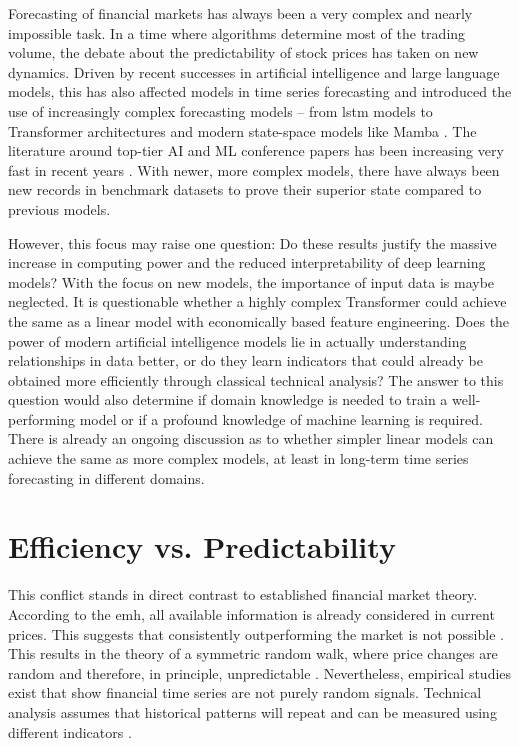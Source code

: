 \documentclass[12pt,twoside=false,a4paper,parskip]{scrbook}
\begin{document}
Forecasting of financial markets has always been a very complex and nearly impossible task. In a time where algorithms determine most of the trading volume, the debate about the predictability of stock prices has taken on new dynamics. Driven by recent successes in artificial intelligence and large language models, this has also affected models in time series forecasting and introduced the use of increasingly complex forecasting models – from \gls{lstm} models to Transformer architectures \cite{NIPS2017_Attention_is_All_you_Need} and modern state-space models like Mamba \cite{gu2024mambalineartimesequencemodeling}. The literature around top-tier AI and ML conference papers has been increasing very fast in recent years \cite[p. 4]{Kim2025Survey}. With newer, more complex models, there have always been new records in benchmark datasets to prove their superior state compared to previous models.

However, this focus may raise one question: Do these results justify the massive increase in computing power and the reduced interpretability of deep learning models? With the focus on new models, the importance of input data is maybe neglected. It is questionable whether a highly complex Transformer could achieve the same as a linear model with economically based feature engineering. Does the power of modern artificial intelligence models lie in actually understanding relationships in data better, or do they learn indicators that could already be obtained more efficiently through classical technical analysis? The answer to this question would also determine if domain knowledge is needed to train a well-performing model or if a profound knowledge of machine learning is required. There is already an ongoing discussion \cite{zeng2022transformerseffectivetimeseries} as to whether simpler linear models can achieve the same as more complex models, at least in long-term time series forecasting in different domains.

\section{Efficiency vs. Predictability}
This conflict stands in direct contrast to established financial market theory. According to the \gls{emh}, all available information is already considered in current prices. 
This suggests that consistently outperforming the market is not possible \cite{EfficientCapitalMarketsFama}.
This results in the theory of a symmetric random walk, where price changes are random and therefore, in principle, unpredictable \cite{randomwalkburton}.
Nevertheless, empirical studies exist that show financial time series are not purely random signals. Technical analysis assumes that historical patterns will repeat and can be measured using different indicators \cite{murphy1999technical}.
\end{document}
